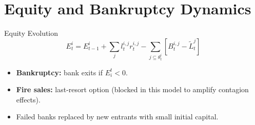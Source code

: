 \section{Equity and Bankruptcy Dynamics}\label{sec:5}

\begin{frame}{Equity Evolution}
  \[
    E_t^i = E_{t-1}^i + \sum_{j} l_{t}^{i,j} r_{t}^{i,j} - \sum_{j \subseteq \theta_t^i} \left[ B_t^{i,j} - \tilde{L}_t^j \right]
  \]
  \begin{itemize}
    \item \textbf{Bankruptcy:} bank exits if $E_i^t < 0$.
    \item \textbf{Fire sales:} last-resort option (blocked in this model to amplify contagion effects).
    \item Failed banks replaced by new entrants with small initial capital.
  \end{itemize}
\end{frame}


